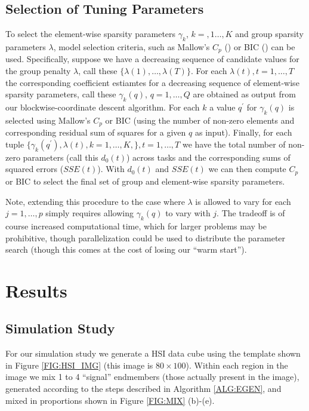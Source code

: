 \documentclass{article}
\numberwithin{equation}{section}
\theoremstyle{plain}
\begin{document}
\subsection{Selection of Tuning Parameters}
\label{SUBSEC:TUNE}

To select the element-wise sparsity parameters $\gamma_k$, $k=,1\ldots,K$ and
group sparsity parameters $\lambda$, model selection criteria, such as Mallow's
$C_p$ (\cite{mallows1973}) or BIC (\cite{schwarz1978}) can be used.
Specifically, suppose we have a decreasing sequence of candidate values for the
group penalty $\lambda$, call these $\{\lambda(1), \ldots, \lambda(T)\}$.
For each $\lambda(t), t = 1,\ldots,T$ the corresponding coefficient estiamtes
for a decreasing sequence of element-wise sparsity parameters, call these
$\gamma_{k}(q)$, $q = 1, \ldots, Q$ are obtained as output from our
blockwise-coordinate descent algorithm. For each $k$ a value $q^{'}$ for
$\gamma_{k}(q)$ is selected using Mallow's $C_p$ or BIC (using the number of
non-zero elements and corresponding residual sum of squares for a given $q$ as
input).
Finally, for each tuple $\{\gamma_{k}(q^{'}), \lambda(t), k=1,\ldots,K,\}, t =
1,\ldots,T$ we have the total number of non-zero parameters (call this $d_0(t)$)
across tasks and the corresponding sums of squared errors ($SSE(t)$).
With $d_0(t)$ and $SSE(t)$ we can then compute $C_p$ or BIC to select the final
set of group and element-wise sparsity parameters.

Note, extending this procedure to the case where $\lambda$ is allowed to vary
for each $j = 1,\ldots,p$ simply requires allowing $\gamma_{k}(q)$ to
vary with $j$. The tradeoff is of course increased computational time, which for
larger problems may be prohibitive, though parallelization could be used to distribute
the parameter search (though this comes at the cost of losing our ``warm
start'').

\section{Results}
\label{SEC:RES}

\subsection{Simulation Study}
For our simulation study we generate a HSI data cube using the template shown in
Figure \ref{FIG:HSI_IMG} (this image is $80 \times 100$).
Within each region in the image we mix 1 to 4 ``signal'' endmembers
(those actually present in the image), generated according to the steps
described in Algorithm \ref{ALG:EGEN}, and mixed in proportions shown in
Figure \ref{FIG:MIX} (b)-(e).
\end{document}
